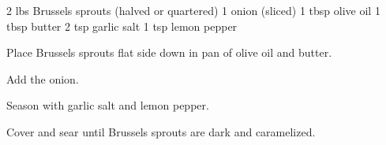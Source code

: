 \dishtype{\side}
\dishother{\vegetarian}
\begin{ingreds}
    2 lbs Brussels sprouts (halved or quartered)
    1 onion (sliced) 
    1 tbsp olive oil
    1 tbsp butter
    2 tsp garlic salt
    1 tsp lemon pepper        
\end{ingreds}
\begin{method}
    Place Brussels sprouts flat side down in pan of olive oil and butter.\par
    Add the onion.\par
    Season with garlic salt and lemon pepper.\par
    Cover and sear until Brussels sprouts are dark and caramelized.
\end{method}